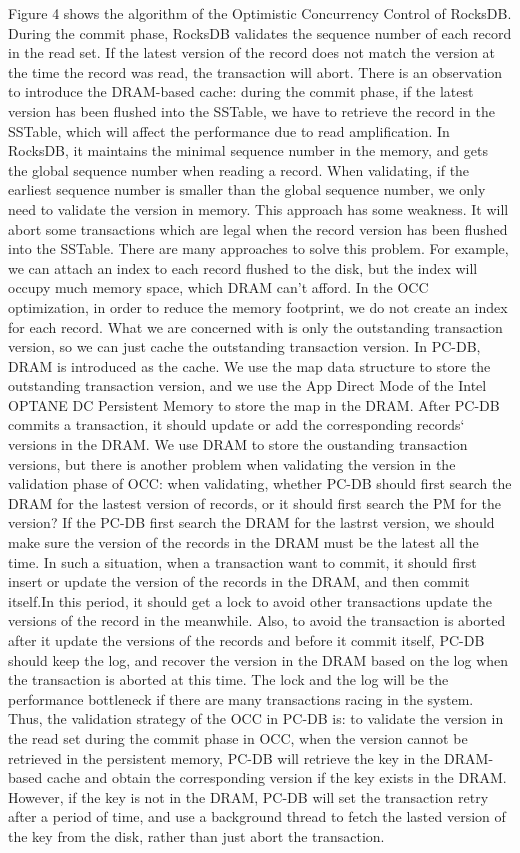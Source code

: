 Figure 4 shows the algorithm of the Optimistic Concurrency Control of RocksDB. During the commit phase, RocksDB validates the sequence number of each record in the read set. If the latest version of the record does not match the version at the time the record was read, the transaction will abort. There is an observation to introduce the DRAM-based cache: during the commit phase, if the latest version has been flushed into the SSTable, we have to retrieve the record in the SSTable, which will affect the performance due to read amplification. In RocksDB, it maintains the minimal sequence number in the memory, and gets the global sequence number when reading a record. When validating, if the earliest sequence number is smaller than the global sequence number, we only need to validate the version in memory. This approach has some weakness. It will abort some transactions which are legal when the record version has been flushed into the SSTable. There are many approaches to solve this problem. For example, we can attach an index to each record flushed to the disk, but the index will occupy much memory space, which DRAM can't afford. In the OCC optimization, in order to reduce the memory footprint, we do not create an index for each record. What we are concerned with is only the outstanding transaction version, so we can just cache the outstanding transaction version. In PC-DB, DRAM is introduced as the cache. We use the map data structure to store the outstanding transaction version, and we use the App Direct Mode of the Intel OPTANE DC Persistent Memory to store the map in the DRAM. After PC-DB commits a transaction, it should update or add the corresponding records` versions in the DRAM. 
We use DRAM to store the oustanding transaction versions, but there is another problem when validating the version in the validation phase of OCC: when validating, whether PC-DB should first search the DRAM for the lastest version of records, or it should first search the PM for the version? If the PC-DB first search the DRAM for the lastrst version, we should make sure the version of the records in the DRAM must be the latest all the time. In such a situation, when a transaction want to commit, it should first insert or update the version of the records in the DRAM, and then commit itself.In this period, it should get a lock to avoid other transactions update the versions of the record in the meanwhile. Also, to avoid the transaction is aborted after it update the versions of the records and before it commit itself, PC-DB should keep the log, and recover the version in the DRAM based on the log when the transaction is aborted at this time. The lock and the log will be the performance bottleneck if there are many transactions racing in the system. Thus, the validation strategy of the OCC in PC-DB is: to validate the version in the read set during the commit phase in OCC, when the version cannot be retrieved in the persistent memory, PC-DB will retrieve  the key in the  DRAM-based cache and obtain the corresponding version if the key exists in the DRAM. However, if the key is not in the DRAM, PC-DB will set the transaction retry after a period of time, and use a background thread to fetch the lasted version of the key from the disk, rather than just abort the transaction. 
